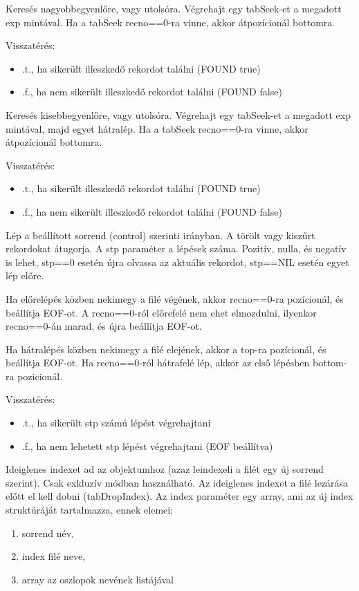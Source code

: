 Keresés nagyobbegyenlőre, vagy utolsóra. 
Végrehajt egy tabSeek-et a megadott exp mintával.
Ha a tabSeek recno==0-ra vinne, akkor átpozícionál bottomra.
 
Visszatérés:
\begin{itemize}
\item .t., ha sikerült illeszkedő rekordot találni (FOUND true)  
\item .f., ha nem sikerült illeszkedő rekordot találni (FOUND false)   
\end{itemize}
 

Keresés kisebbegyenlőre, vagy utolsóra. 
Végrehajt egy tabSeek-et a megadott exp mintával, majd egyet hátralép.
Ha a tabSeek recno==0-ra vinne, akkor átpozícionál bottomra.
 
Visszatérés:
\begin{itemize}
\item .t., ha sikerült illeszkedő rekordot találni (FOUND true)  
\item .f., ha nem sikerült illeszkedő rekordot találni (FOUND false)   
\end{itemize}
 

Lép a beállított sorrend (control) szerinti irányban.
A törölt vagy kiszűrt rekordokat átugorja.
A stp paraméter a lépések száma. Pozitív, nulla, és negatív is lehet,
stp==0 esetén újra olvassa az aktuális rekordot, stp==NIL esetén 
egyet lép előre. 

Ha előrelépés közben nekimegy a filé végének, 
akkor recno==0-ra pozícionál, és beállítja EOF-ot.
A recno==0-ról előrefelé nem ehet elmozdulni, 
ilyenkor recno==0-án marad, és újra beállítja EOF-ot.
 
Ha hátralépés közben nekimegy a filé elejének, 
akkor a top-ra pozícionál, és beállítja EOF-ot. 
Ha recno==0-ról hátrafelé lép, 
akkor az első lépésben bottom-ra pozicionál.

Visszatérés:
\begin{itemize}
\item .t., ha sikerült stp számú lépést végrehajtani  
\item .f., ha nem lehetett stp lépést végrehajtani (EOF beállítva)
\end{itemize}
 

Ideiglenes indexet ad az objektumhoz
(azaz leindexeli a filét egy új sorrend szerint). 
Csak exkluzív módban használható.
Az ideiglenes indexet a filé lezárása előtt el kell dobni (tabDropIndex).
Az index paraméter egy array, ami az új index struktúráját tartalmazza,
ennek elemei:
\begin{enumerate}
\item sorrend név,
\item index filé neve,
\item array az oszlopok nevének listájával
\end{enumerate}

